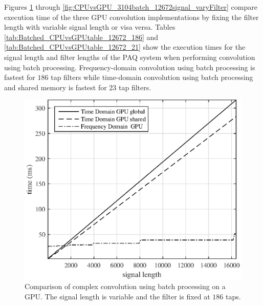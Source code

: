 Figures \ref{fig:CPUvsGPU_3104batch_186taps_varySignal} through \ref{fig:CPUvsGPU_3104batch_12672signal_varyFilter} 
compare execution time of the three GPU convolution implementations by fixing the filter length with variable signal length or visa versa.
Tables \ref{tab:Batched_CPUvsGPUtable_12672_186} and \ref{tab:Batched_CPUvsGPUtable_12672_21} 
show the execution times for the signal length and filter lengths of the PAQ system when performing convolution using batch processing.
Frequency-domain convolution using batch processing is fastest for $186$ tap filters while 
time-domain convolution using batch processing and shared memory is fastest for $23$ tap filters.
\begin{figure}
	\centering\includegraphics[width=5in]{figures/gpu_intro/CPUvsGPU_3104batch_186taps_varySignal.eps}
	\caption{Comparison of complex convolution using batch processing on a GPU. The signal length is variable and the filter is fixed at $186$ taps.}
	\label{fig:CPUvsGPU_3104batch_186taps_varySignal}
\end{figure}
